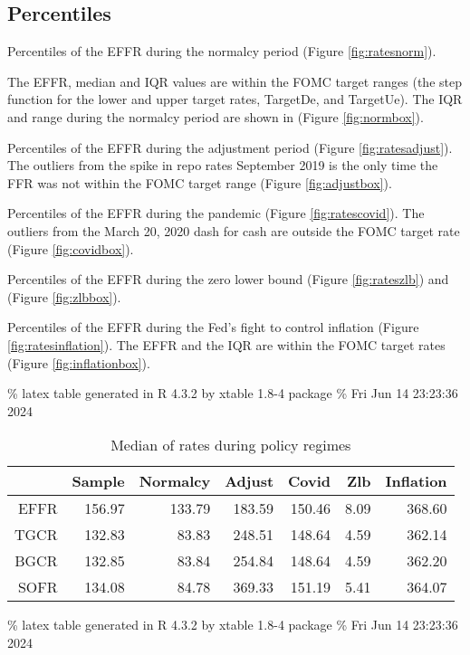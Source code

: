 \documentclass[
]{article}
\begin{document}
\hypertarget{percentiles}{%
\subsection{Percentiles}\label{percentiles}}

Percentiles of the EFFR during the normalcy period (Figure \ref{fig:ratesnorm}).

The EFFR, median and IQR values are within the FOMC target ranges (the step function for the lower and upper target rates, TargetDe, and TargetUe).
The IQR and range during the normalcy period are shown in (Figure \ref{fig:normbox}).

Percentiles of the EFFR during the adjustment period (Figure \ref{fig:ratesadjust}).
The outliers from the spike in repo rates September 2019 is the only time the FFR was not within the FOMC target range (Figure \ref{fig:adjustbox}).

Percentiles of the EFFR during the pandemic (Figure \ref{fig:ratescovid}).
The outliers from the March 20, 2020 dash for cash are outside the FOMC target rate
(Figure \ref{fig:covidbox}).

Percentiles of the EFFR during the zero lower bound (Figure \ref{fig:rateszlb})
and (Figure \ref{fig:zlbbox}).

Percentiles of the EFFR during the Fed's fight to control inflation (Figure \ref{fig:ratesinflation}).
The EFFR and the IQR are within the FOMC target rates (Figure \ref{fig:inflationbox}).

\% latex table generated in R 4.3.2 by xtable 1.8-4 package
\% Fri Jun 14 23:23:36 2024

\begin{table}[ht]
\centering
\begin{tabular}{rrrrrrr}
  \hline
 & Sample & Normalcy & Adjust & Covid & Zlb & Inflation \\ 
  \hline
EFFR & 156.97 & 133.79 & 183.59 & 150.46 & 8.09 & 368.60 \\ 
  TGCR & 132.83 & 83.83 & 248.51 & 148.64 & 4.59 & 362.14 \\ 
  BGCR & 132.85 & 83.84 & 254.84 & 148.64 & 4.59 & 362.20 \\ 
  SOFR & 134.08 & 84.78 & 369.33 & 151.19 & 5.41 & 364.07 \\ 
   \hline
\end{tabular}
\caption{Median of rates during policy regimes} 
\end{table}

\% latex table generated in R 4.3.2 by xtable 1.8-4 package
\% Fri Jun 14 23:23:36 2024
\end{document}
